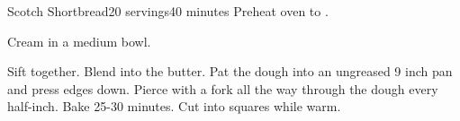 \documentclass[../Cookbook.tex]{subfiles}
\begin{document}
\begin{recipe}[ScotchShortbread]{Scotch Shortbread}{20 servings}{40 minutes}
    Preheat oven to .

    Cream in a medium bowl.

    Sift together.
    Blend into the butter.
    Pat the dough into an ungreased 9 inch pan and press edges down.
    Pierce with a fork all the way through the dough every half-inch.
    Bake 25-30 minutes.
    Cut into squares while warm.
\end{recipe}
\end{document}
